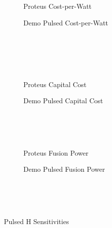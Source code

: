 \begin{figure*}
    \centering
    \hfill 
    \begin{subfigure}[t]{0.45\textwidth}
        \centering
		\begin{adjustbox}{width=\textwidth}
			\Large
			
		\end{adjustbox}
        \caption{Proteus Cost-per-Watt}
    \end{subfigure}
    \hfill
    \begin{subfigure}[t]{0.45\textwidth}
        \centering
		\begin{adjustbox}{width=\textwidth}
			\Large
			
		\end{adjustbox}
        \caption{Demo Pulsed Cost-per-Watt}
    \end{subfigure}
    \hfill \hfill ~\\ ~\\ ~\\ ~\\
    \hfill 
    \begin{subfigure}[t]{0.45\textwidth}
        \centering
		\begin{adjustbox}{width=\textwidth}
			\Large
			
		\end{adjustbox}
        \caption{Proteus Capital Cost}
    \end{subfigure}
    \hfill
    \begin{subfigure}[t]{0.45\textwidth}
        \centering
		\begin{adjustbox}{width=\textwidth}
			\Large
			
		\end{adjustbox}
        \caption{Demo Pulsed Capital Cost}
    \end{subfigure}	
    \hfill \hfill ~\\ ~\\ ~\\
    \hfill 
    \begin{subfigure}[t]{0.45\textwidth}
        \centering
		\begin{adjustbox}{width=\textwidth}
			\Large
			
		\end{adjustbox}
        \caption{Proteus Fusion Power}
    \end{subfigure}
    \hfill
    \begin{subfigure}[t]{0.45\textwidth}
        \centering
		\begin{adjustbox}{width=\textwidth}
			\Large
			
		\end{adjustbox}
        \caption{Demo Pulsed Fusion Power}
    \end{subfigure}	
    \hfill \hfill ~\\ ~\\ ~\\
    \caption{Pulsed H Sensitivities}
    \label{fig:pulsed_h}
\end{figure*}

